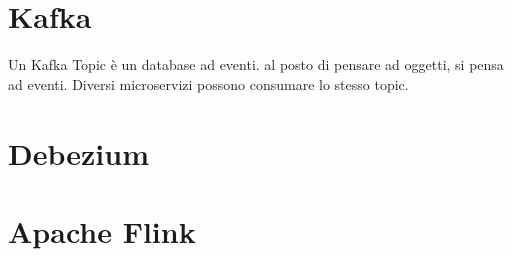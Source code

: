 \chapter{Kafka}
\label{ch:kafka_overview}
Un Kafka Topic è un database ad eventi. al posto di pensare ad oggetti, si pensa ad eventi. 
Diversi microservizi possono consumare lo stesso topic.

\chapter{Debezium}
\label{ch:debezium_overview}

\chapter{Apache Flink}
\label{ch:flink_overview}
